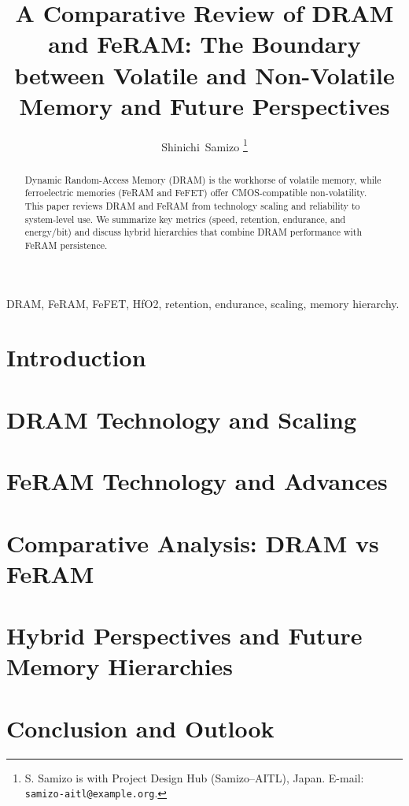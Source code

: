 \documentclass[journal]{IEEEtran}
\title{A Comparative Review of DRAM and FeRAM: The Boundary between Volatile and Non-Volatile Memory and Future Perspectives}
\author{Shinichi~Samizo%
\thanks{S. Samizo is with Project Design Hub (Samizo–AITL), Japan. E-mail: \texttt{samizo-aitl@example.org}.}
}
\begin{document}
\maketitle

\begin{abstract}
Dynamic Random-Access Memory (DRAM) is the workhorse of volatile memory, while ferroelectric memories (FeRAM and FeFET) offer CMOS-compatible non-volatility. This paper reviews DRAM and FeRAM from technology scaling and reliability to system-level use. We summarize key metrics (speed, retention, endurance, and energy/bit) and discuss hybrid hierarchies that combine DRAM performance with FeRAM persistence.
\end{abstract}

\begin{IEEEkeywords}
DRAM, FeRAM, FeFET, HfO2, retention, endurance, scaling, memory hierarchy.
\end{IEEEkeywords}

\section{Introduction}


\section{DRAM Technology and Scaling}


\section{FeRAM Technology and Advances}


\section{Comparative Analysis: DRAM vs FeRAM}
\label{sec:comparison}


\section{Hybrid Perspectives and Future Memory Hierarchies}


\section{Conclusion and Outlook}




\end{document}
